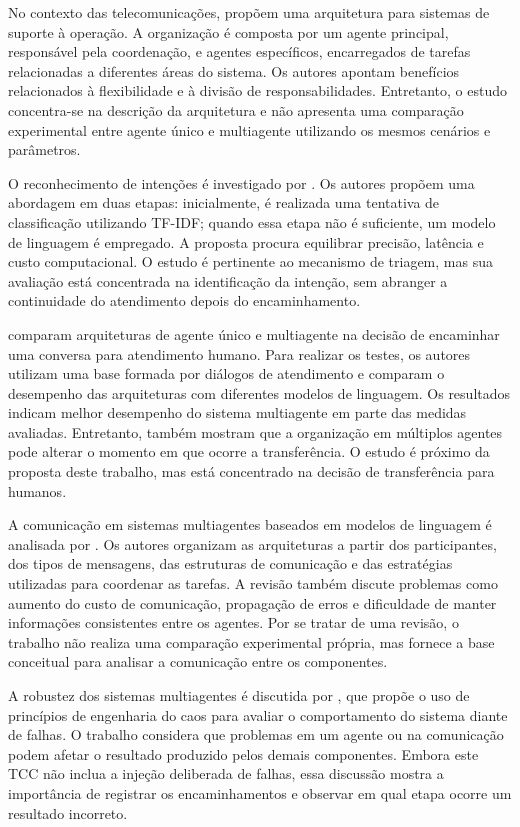 No contexto das telecomunicações, \textcite{lee2025} propõem uma arquitetura para sistemas de suporte à operação. A organização é composta por um agente principal, responsável pela coordenação, e agentes específicos, encarregados de tarefas relacionadas a diferentes áreas do sistema. Os autores apontam benefícios relacionados à flexibilidade e à divisão de responsabilidades. Entretanto, o estudo concentra-se na descrição da arquitetura e não apresenta uma comparação experimental entre agente único e multiagente utilizando os mesmos cenários e parâmetros.

O reconhecimento de intenções é investigado por \textcite{yang2025}. Os autores propõem uma abordagem em duas etapas: inicialmente, é realizada uma tentativa de classificação utilizando TF-IDF; quando essa etapa não é suficiente, um modelo de linguagem é empregado. A proposta procura equilibrar precisão, latência e custo computacional. O estudo é pertinente ao mecanismo de triagem, mas sua avaliação está concentrada na identificação da intenção, sem abranger a continuidade do atendimento depois do encaminhamento.

\textcite{amri2026} comparam arquiteturas de agente único e multiagente na decisão de encaminhar uma conversa para atendimento humano. Para realizar os testes, os autores utilizam uma base formada por diálogos de atendimento e comparam o desempenho das arquiteturas com diferentes modelos de linguagem. Os resultados indicam melhor desempenho do sistema multiagente em parte das medidas avaliadas. Entretanto, também mostram que a organização em múltiplos agentes pode alterar o momento em que ocorre a transferência. O estudo é próximo da proposta deste trabalho, mas está concentrado na decisão de transferência para humanos.

A comunicação em sistemas multiagentes baseados em modelos de linguagem é analisada por \textcite{yan2026}. Os autores organizam as arquiteturas a partir dos participantes, dos tipos de mensagens, das estruturas de comunicação e das estratégias utilizadas para coordenar as tarefas. A revisão também discute problemas como aumento do custo de comunicação, propagação de erros e dificuldade de manter informações consistentes entre os agentes. Por se tratar de uma revisão, o trabalho não realiza uma comparação experimental própria, mas fornece a base conceitual para analisar a comunicação entre os componentes.

A robustez dos sistemas multiagentes é discutida por \textcite{owotogbe2025}, que propõe o uso de princípios de engenharia do caos para avaliar o comportamento do sistema diante de falhas. O trabalho considera que problemas em um agente ou na comunicação podem afetar o resultado produzido pelos demais componentes. Embora este TCC não inclua a injeção deliberada de falhas, essa discussão mostra a importância de registrar os encaminhamentos e observar em qual etapa ocorre um resultado incorreto.

